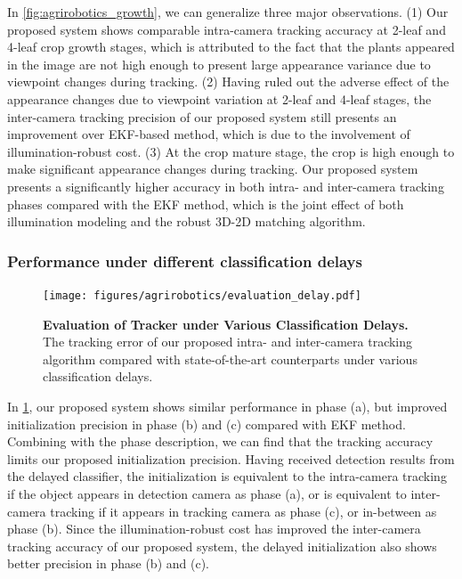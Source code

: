 In \ref{fig:agrirobotics_growth}, we can generalize three major observations. (1) Our proposed system shows comparable intra-camera tracking accuracy at 2-leaf and 4-leaf crop growth stages, which is attributed to the fact that the plants appeared in the image are not high enough to present large appearance variance due to viewpoint changes during tracking. (2) Having ruled out the adverse effect of the appearance changes due to viewpoint variation at 2-leaf and 4-leaf stages, the inter-camera tracking precision of our proposed system still presents an improvement over EKF-based method, which is due to the involvement of illumination-robust cost. (3) At the crop mature stage, the crop is high enough to make significant appearance changes during tracking. Our proposed system presents a significantly higher accuracy in both intra- and inter-camera tracking phases compared with the EKF method, which is the joint effect of both illumination modeling and the robust 3D-2D matching algorithm.


\subsubsection{Performance under different classification delays}

\begin{figure}[t] 
	\centering
	\texttt{[image: figures/agrirobotics/evaluation\_delay.pdf]}
	\caption[Evaluation of Tracker under Various Classification Delays] { \textbf{Evaluation of Tracker under Various Classification Delays.} The tracking error of our proposed intra- and inter-camera tracking algorithm compared with state-of-the-art counterparts under various classification delays. 
	\label{fig:agrirobotics_delay}}
\end{figure}

In \ref{fig:agrirobotics_delay}, our proposed system shows similar performance in phase (a), but improved initialization precision in phase (b) and (c) compared with EKF method. Combining with the phase description, we can find that the tracking accuracy limits our proposed initialization precision. Having received detection results from the delayed classifier, the initialization is equivalent to the intra-camera tracking if the object appears in detection camera as phase (a), or is equivalent to inter-camera tracking if it appears in tracking camera as phase (c), or in-between as phase (b). Since the illumination-robust cost has improved the inter-camera tracking accuracy of our proposed system, the delayed initialization also shows better precision in phase (b) and (c). 

